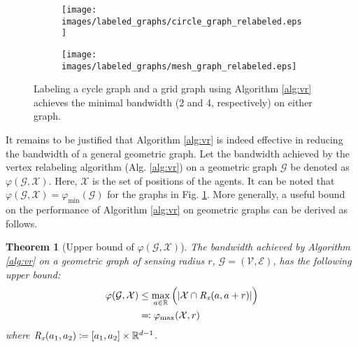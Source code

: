\documentclass[twocolumn]{article}
\theoremstyle{plain}
\newtheorem{theorem}{Theorem}
\theoremstyle{definition}
\theoremstyle{definition}
\theoremstyle{remark}
\begin{document}
\begin{figure}[h]
\centering
        \begin{subfigure}{0.2\textwidth}
            \centering
            \texttt{[image: images/labeled\_graphs/circle\_graph\_relabeled.eps]}
        \end{subfigure}
        \begin{subfigure}[t]{0.28\textwidth}
            \centering
            \texttt{[image: images/labeled\_graphs/mesh\_graph\_relabeled.eps]}
        \end{subfigure}
        \caption{Labeling a cycle graph and a grid graph using Algorithm \ref{alg:vr} achieves the minimal bandwidth (2 and 4, respectively) on either graph.}
        \label{fig:graphs_2}
\end{figure}
It remains to be justified that Algorithm \ref{alg:vr} is indeed effective in reducing the bandwidth of a general geometric graph.
Let the bandwidth achieved by the vertex relabeling algorithm (Alg. \ref{alg:vr}) on a geometric graph $\mathcal G$ be denoted as $\varphi (\mathcal G, \mathcal X)$. Here, $\mathcal X$ is the set of positions of the agents.
It can be noted that $\varphi(\mathcal G, \mathcal X) = \varphi_{\textrm{min}}(\mathcal G)$ for the graphs in Fig. \ref{fig:graphs_2}. More generally, a useful bound on the performance of Algorithm \ref{alg:vr} on geometric graphs can be derived as follows.
\begin{theorem}[Upper bound of $\varphi(\mathcal G, \mathcal X)$]
The bandwidth achieved by Algorithm \ref{alg:vr} on a geometric graph of sensing radius $r$, $\mathcal G=(\mathcal V, \mathcal E)$, has the following upper bound:
\begin{align}
\varphi (\mathcal G, \mathcal X) &\leq
\max_{a\in \mathbb R}\Big
( | \mathcal{X}\cap \textit{R}_\emph{x}(a, a+r) | \Big)  \nonumber
\\
&\eqqcolon \varphi _{\textrm{max}}(\mathcal X, r)
\label{eqn:vr_bound}
\end{align}
where $\textit{R}_\emph{x}(a_1,a_2)\coloneqq [a_1, a_2]\times\mathbb R^{d-1}$.
\label{theorem:vr_bound}
\end{theorem}
\end{document}
